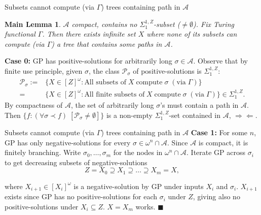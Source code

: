 \begin{frame}{Subsets cannot compute (via $\Gamma$) trees containing path
in $\mathcal{A}$}
  \newtheorem*{main-lemma*}{Main Lemma}
  \begin{main-lemma*}
    \label{lemma:fixed-machine}
    $\mathcal{A}$ compact, contains no $\Sigma_1^{1,Z}$-subset
    ($\neq\emptyset$). Fix Turing functional $\Gamma$. Then there exists
    infinite set $X$ where none of its subsets can compute (via $\Gamma$) a
    tree that contains some paths in $\mathcal{A}$.
  \end{main-lemma*}

  \vspace{0.5em}
  \textbf{Case 0:} GP has positive-solutions for arbitrarily long
  $\sigma\in\mathcal{A}$. Observe that by finite use principle, given
  $\sigma$, the class $\mathcal{P}_{\sigma}$ of positive-solutions is
  $\Sigma_1^{1,Z}$:
  \begin{align*}
    \mathcal{P}_{\sigma}:= &\{X\in[Z]^\omega: \text{All subsets of}\; X\;
      \text{compute}\; \sigma\; (\text{via}\; \Gamma)\}\\
    =&\{X\in[Z]^\omega: \text{All finite subsets of}\; X\;
      \text{compute}\; \sigma\; (\text{via}\; \Gamma)\}
      \in\Sigma_1^{1,Z}.
  \end{align*}
  By compactness of $\mathcal{A}$, the set of arbitrarily long $\sigma$'s
  must contain a path in $\mathcal{A}$. Then $\{f:(\forall \sigma\prec f)\;
  [\mathcal{P}_\sigma \neq \emptyset]\}$ is a non-empty
  $\Sigma_1^{1,Z}$-set contained in $\mathcal{A}$, $\Rightarrow\Leftarrow$.
\end{frame}

\begin{frame}{Subsets cannot compute (via $\Gamma$) trees containing path
in $\mathcal{A}$}
  \textbf{Case 1:} For some $n$, GP has only negative-solutions for every
  $\sigma\in\omega^n\cap\mathcal{A}$. Since $\mathcal{A}$ is compact, it is
  finitely branching. Write $\sigma_0,\ldots,\sigma_m$ for the
  nodes in $\omega^n\cap\mathcal{A}$. Iterate GP across $\sigma_i$ to get
  decreasing subsets of negative-solutions
  \[Z=X_0 \supseteq X_1 \supseteq \ldots\supseteq X_m=X,\]

  where $X_{i+1}\in[X_i]^\omega$ is a negative-solution by GP under
  inputs $X_i$ and $\sigma_i$. $X_{i+1}$ exists since GP has no
  positive-solutions for each $\sigma_i$ under $Z$, giving also no
  positive-solutions under $X_i\subseteq Z$. $X=X_m$ works. $\blacksquare$
\end{frame}

